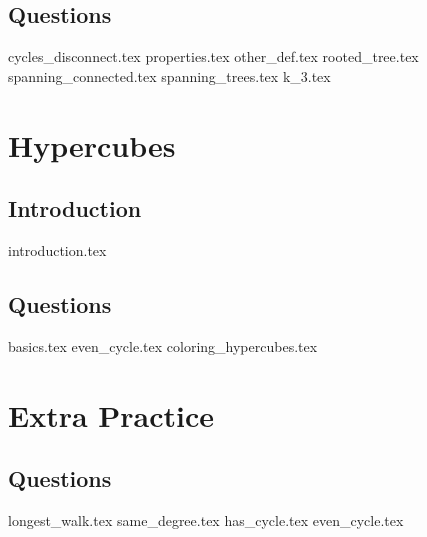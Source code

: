 \documentclass{exam}
\begin{document}
\subsection{Questions}
\begin{questions}
{cycles_disconnect.tex}
{properties.tex}
{other_def.tex}
{rooted_tree.tex}
{spanning_connected.tex}
{spanning_trees.tex}
{k_3.tex}
\end{questions}

\section{Hypercubes}
\subsection{Introduction}
{introduction.tex}
\subsection{Questions}
\begin{questions}
{basics.tex}
{even_cycle.tex}
{coloring_hypercubes.tex}
\end{questions}

\section{Extra Practice}
\subsection{Questions}
\begin{questions}
{longest_walk.tex}
{same_degree.tex}
{has_cycle.tex}
{even_cycle.tex}
\end{questions}
\end{document}
